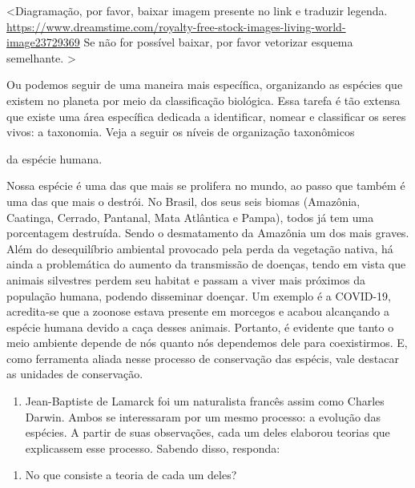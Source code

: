 \textless{}Diagramação, por favor, baixar imagem presente no link e
traduzir legenda.
\url{https://www.dreamstime.com/royalty-free-stock-images-living-world-image23729369}
Se não for possível baixar, por favor vetorizar esquema semelhante.
\textgreater{}

Ou podemos seguir de uma maneira mais específica, organizando as
espécies que existem no planeta por meio da classificação biológica.
Essa tarefa é tão extensa que existe uma área específica dedicada a
identificar, nomear e classificar os seres vivos: a taxonomia. Veja a
seguir os níveis de organização taxonômicos

da espécie humana.

Nossa espécie é uma das que mais se prolifera no mundo, ao passo que
também é uma das que mais o destrói. No Brasil, dos seus seis biomas
(Amazônia, Caatinga, Cerrado, Pantanal, Mata Atlântica e Pampa), todos
já tem uma porcentagem destruída. Sendo o desmatamento da Amazônia um
dos mais graves. Além do desequilíbrio ambiental provocado pela perda da
vegetação nativa, há ainda a problemática do aumento da transmissão de
doenças, tendo em vista que animais silvestres perdem seu habitat e
passam a viver mais próximos da população humana, podendo disseminar
doençar. Um exemplo é a COVID-19, acredita-se que a zoonose estava
presente em morcegos e acabou alcançando a espécie humana devido a caça
desses animais. Portanto, é evidente que tanto o meio ambiente depende
de nós quanto nós dependemos dele para coexistirmos. E, como ferramenta
aliada nesse processo de conservação das espécis, vale destacar as
unidades de conservação.

\begin{enumerate}
\def\labelenumi{\arabic{enumi}.}
\item
  Jean-Baptiste de Lamarck foi um naturalista francês assim como Charles
  Darwin. Ambos se interessaram por um mesmo processo: a evolução das
  espécies. A partir de suas observações, cada um deles elaborou teorias
  que explicassem esse processo. Sabendo disso, responda:
\end{enumerate}

\begin{enumerate}
\def\labelenumi{\alph{enumi})}
\item
  No que consiste a teoria de cada um deles?
\end{enumerate}

